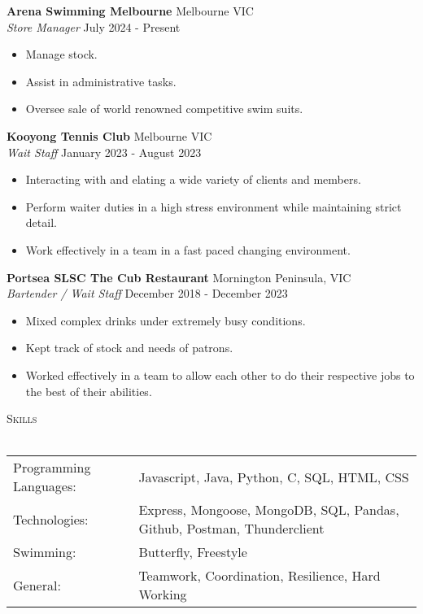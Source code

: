 \documentclass[a4paper]{article}
\newcommand{\lineunder} {
    \vspace*{-8pt} \\
    \hspace*{-18pt} \hrulefill \\
}
\newcommand{\header} [1] {
    {\hspace*{-18pt}\vspace*{6pt} \textsc{#1}}
    \vspace*{-6pt} \lineunder
}
\begin{document}
\textbf{Arena Swimming Melbourne} \hfill Melbourne VIC\\
\textit{Store Manager} \hfill July 2024 - Present\\
\vspace{-1mm}
\begin{itemize} \itemsep 1pt
	\item Manage stock.
	\item Assist in administrative tasks.
	\item Oversee sale of world renowned competitive swim suits.
\end{itemize}
\textbf{Kooyong Tennis Club} \hfill Melbourne VIC\\
\textit{Wait Staff} \hfill January 2023 - August 2023\\
\vspace{-1mm}
\begin{itemize} \itemsep 1pt
	\item Interacting with and elating a wide variety of clients and members.
	\item Perform waiter duties in a high stress environment while maintaining strict detail.
	\item Work effectively in a team in a fast paced changing environment.
\end{itemize}
\textbf{Portsea SLSC \textquotesingle{}The Cub\textquotesingle{} Restaurant} \hfill Mornington Peninsula, VIC\\
\textit{Bartender / Wait Staff} \hfill December 2018 - December 2023\\
\vspace{-1mm}
\begin{itemize} \itemsep 1pt
	\item Mixed complex drinks under extremely busy conditions.
	\item Kept track of stock and needs of patrons.
	\item Worked effectively in a team to allow each other to do their respective jobs to the best of their abilities.
\end{itemize}

\header{Skills}
\begin{tabular}{ l l }
	Programming Languages:    & Javascript, Java, Python, C, SQL, HTML, CSS \\
	Technologies:             & Express, Mongoose, MongoDB, SQL, Pandas, Github, Postman, Thunderclient                                      
                \\
	Swimming:                 & Butterfly, Freestyle                                 \\
	General:                  & Teamwork, Coordination, Resilience, Hard Working     \\
\end{tabular}
\vspace{2mm}
\end{document}
